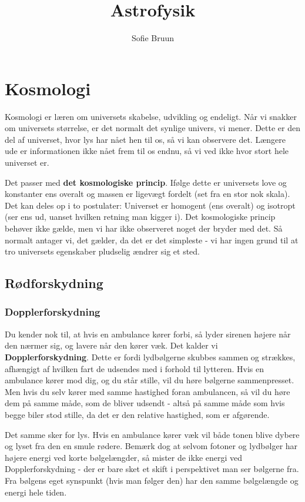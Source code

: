 \documentclass[a4paper]{article}
\title{Astrofysik} %
\author{Sofie Bruun}
\begin{document}
\maketitle

\section{Kosmologi}
Kosmologi er læren om universets skabelse, udvikling og endeligt. Når vi snakker om universets størrelse, er det normalt det synlige univers, vi mener. Dette er den del af universet, hvor lys har nået hen til os, så vi kan observere det. Længere ude er informationen ikke nået frem til os endnu, så vi ved ikke hvor stort hele universet er. 

Det passer med \textbf{det kosmologiske princip}. Ifølge dette er universets love og konstanter ens overalt og massen er ligevægt fordelt (set fra en stor nok skala). Det kan deles op i to postulater: Universet er homogent (ens overalt) og isotropt (ser ens ud, uanset hvilken retning man kigger i). Det kosmologiske princip behøver ikke gælde, men vi har ikke observeret noget der bryder med det. Så normalt antager vi, det gælder, da det er det simpleste - vi har ingen grund til at tro universets egenskaber pludselig ændrer sig et sted.

\subsection{Rødforskydning}
\subsubsection{Dopplerforskydning}
Du kender nok til, at hvis en ambulance kører forbi, så lyder sirenen højere når den nærmer sig, og lavere når den kører væk. Det kalder vi \textbf{Dopplerforskydning}. %
Dette er fordi lydbølgerne skubbes sammen og strækkes, afhængigt af hvilken fart de udsendes med i forhold til lytteren. Hvis en ambulance kører mod dig, og du står stille, vil du høre bølgerne sammenpresset. Men hvis du selv kører med samme hastighed foran ambulancen, så vil du høre dem på samme måde, som de bliver udsendt - altså på samme måde som hvis begge biler stod stille, da det er den relative hastighed, som er afgørende.

Det samme sker for lys. Hvis en ambulance kører væk vil både tonen blive dybere og lyset fra den en smule rødere. Bemærk dog at selvom fotoner og lydbølger har højere energi ved korte bølgelængder, så mister de ikke energi ved Dopplerforskydning - der er bare sket et skift i perspektivet man ser bølgerne fra. Fra bølgens eget synspunkt (hvis man følger den) har den samme bølgelængde og energi hele tiden.
\end{document}
